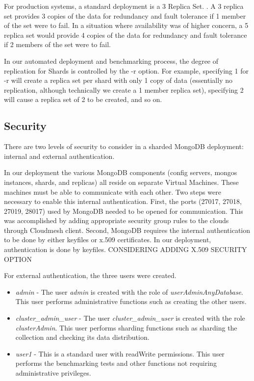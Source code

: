 \documentclass[9pt,twocolumn,twoside]{../../styles/osajnl}
\begin{document}
For production systems, a standard deployment is a 3 Replica Set.  \cite{www-mongoRepDep}.  A 3 replica set provides 3 copies of the data for redundancy and fault tolerance if 1 member of the set were to fail.  In a situation where availability was of higher concern, a 5 replica set would provide 4 copies of the data for redundancy and fault tolerance if 2 members of the set were to fail.

In our automated deployment and benchmarking process, the degree of replication for Shards is controlled by the -r option. For example, specifying 1 for -r will create a replica set per shard with only 1 copy of data (essentially no replication, although technically we create a 1 member replica set), specifying 2 will cause a replica set of 2 to be created, and so on.

\subsection{Security}

There are two levels of security to consider in a sharded MongoDB deployment: internal and external authentication.

In our deployment the various MongoDB components (config servers, mongos instances, shards, and replicas) all reside on separate Virtual Machines.  These machines must be able to communicate with each other.  Two steps were necessary to enable this internal authentication.  First, the ports (27017, 27018, 27019, 28017) used by MongoDB needed to be opened for communication.  This was accomplished by adding appropriate security group rules to the clouds through Cloudmesh client.  Second, MongoDB requires the internal authentication to be done by either keyfiles or x.509 certificates.  \cite{www-mongoAuth}  In our deployment, authentication is done by keyfiles. CONSIDERING ADDING X.509 SECURITY OPTION

For external authentication, the three users were created.

\begin{itemize}
\item \emph{admin} - The user \emph{admin} is created with the role of \emph{userAdminAnyDatabase}.  This user performs administrative functions such as creating the other users.
\item \emph{cluster\_admin\_user} - The user \emph{cluster\_admin\_user} is created with the role \emph{clusterAdmin}. This user performs sharding functions such as sharding the collection and checking its data distribution.
\item \emph{user1} - This is a standard user with readWrite permissions.  This user performs the benchmarking tests and other functions not requiring administrative privileges.
\end{itemize}
\end{document}

